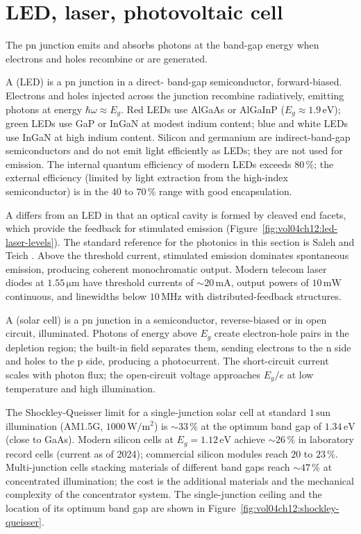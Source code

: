 \section{LED, laser, photovoltaic cell}

The pn junction emits and absorbs photons at the band-gap energy
when electrons and holes recombine or are generated.

A  (LED) is a pn junction in a direct-
band-gap semiconductor, forward-biased. Electrons and holes injected
across the junction recombine radiatively, emitting photons at energy
$\hbar\omega \approx E_{g}$. Red LEDs use AlGaAs or AlGaInP
($E_{g} \approx 1.9\,\si{\electronvolt}$); green LEDs use GaP or
InGaN at modest indium content; blue and white LEDs use InGaN at
high indium content. Silicon and germanium are indirect-band-gap
semiconductors and do not emit light efficiently as LEDs; they are
not used for emission. The internal quantum efficiency of modern
LEDs exceeds $80\,\%$; the external efficiency (limited by light
extraction from the high-index semiconductor) is in the $40$ to
$70\,\%$ range with good encapsulation.



A  differs from an LED in that an optical cavity
is formed by cleaved end facets, which provide the feedback for
stimulated emission
(Figure~\ref{fig:vol04ch12:led-laser-levels}). The standard reference
for the photonics in this section is Saleh and Teich
\cite{text:saleh-teich-photonics}. Above the threshold current, stimulated emission
dominates spontaneous emission, producing coherent monochromatic
output. Modern telecom laser diodes at $1.55\,\si{\micro\meter}$ have
threshold currents of $\sim 20\,\si{\milli\ampere}$, output powers of
$10\,\si{\milli\watt}$ continuous, and linewidths below $10\,\si{
\mega\hertz}$ with distributed-feedback structures.

A  (solar cell) is a pn junction in a
semiconductor, reverse-biased or in open circuit, illuminated. Photons
of energy above $E_{g}$ create electron-hole pairs in the depletion
region; the built-in field separates them, sending electrons to the
n side and holes to the p side, producing a photocurrent. The
short-circuit current scales with photon flux; the open-circuit
voltage approaches $E_{g}/e$ at low temperature and high illumination.

The Shockley-Queisser limit for a single-junction solar cell at
standard $1\,\text{sun}$ illumination (AM1.5G, $1000\,\si{\watt\per
\meter\squared}$) is $\sim 33\,\%$ at the optimum band gap of
$1.34\,\si{\electronvolt}$ (close to GaAs). Modern silicon cells at
$E_{g} = 1.12\,\si{\electronvolt}$ achieve $\sim 26\,\%$ in
laboratory record cells (current as of 2024); commercial silicon
modules reach $20$ to $23\,\%$. Multi-junction cells stacking
materials of different band gaps reach $\sim 47\,\%$ at concentrated
illumination; the cost is the additional materials and the
mechanical complexity of the concentrator system. The single-junction
ceiling and the location of its optimum band gap are shown in
Figure~\ref{fig:vol04ch12:shockley-queisser}.

